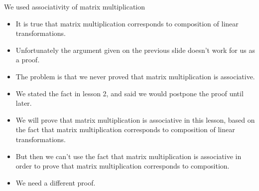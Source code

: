 \documentclass{beamer}
\begin{document}
\begin{frame}{We used associativity of matrix multiplication}

\begin{itemize}
\item It is true that matrix multiplication corresponds to composition of linear transformations.
\item Unfortunately the argument given on the previous slide doesn't work for us as a proof.
\item The problem is that we never proved that matrix multiplication is associative.
\item We stated the fact in lesson 2, and said we would postpone the proof until later.
\item We will prove that matrix multiplication is associative in this lesson, based on
the fact that matrix multiplication corresponds to composition of linear transformations.
\item But then we can't use the fact that matrix multiplication is associative in order
to prove that matrix multiplication corresponds to composition.
\item We need a different proof.
\end{itemize}

\end{frame}
\end{document}
